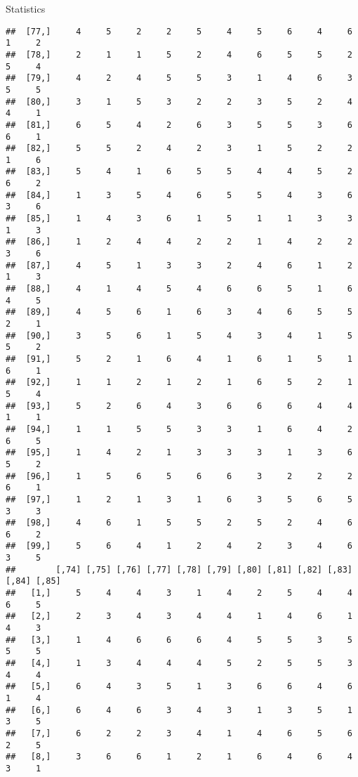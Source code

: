 \documentclass[
  ignorenonframetext,
]{beamer}
\begin{document}
\begin{frame}[fragile]{Statistics}
\begin{verbatim}
##  [77,]     4     5     2     2     5     4     5     6     4     6     1     2
##  [78,]     2     1     1     5     2     4     6     5     5     2     5     4
##  [79,]     4     2     4     5     5     3     1     4     6     3     5     5
##  [80,]     3     1     5     3     2     2     3     5     2     4     4     1
##  [81,]     6     5     4     2     6     3     5     5     3     6     6     1
##  [82,]     5     5     2     4     2     3     1     5     2     2     1     6
##  [83,]     5     4     1     6     5     5     4     4     5     2     6     2
##  [84,]     1     3     5     4     6     5     5     4     3     6     3     6
##  [85,]     1     4     3     6     1     5     1     1     3     3     1     3
##  [86,]     1     2     4     4     2     2     1     4     2     2     3     6
##  [87,]     4     5     1     3     3     2     4     6     1     2     1     3
##  [88,]     4     1     4     5     4     6     6     5     1     6     4     5
##  [89,]     4     5     6     1     6     3     4     6     5     5     2     1
##  [90,]     3     5     6     1     5     4     3     4     1     5     5     2
##  [91,]     5     2     1     6     4     1     6     1     5     1     6     1
##  [92,]     1     1     2     1     2     1     6     5     2     1     5     4
##  [93,]     5     2     6     4     3     6     6     6     4     4     1     1
##  [94,]     1     1     5     5     3     3     1     6     4     2     6     5
##  [95,]     1     4     2     1     3     3     3     1     3     6     5     2
##  [96,]     1     5     6     5     6     6     3     2     2     2     6     1
##  [97,]     1     2     1     3     1     6     3     5     6     5     3     3
##  [98,]     4     6     1     5     5     2     5     2     4     6     6     2
##  [99,]     5     6     4     1     2     4     2     3     4     6     3     5
##        [,74] [,75] [,76] [,77] [,78] [,79] [,80] [,81] [,82] [,83] [,84] [,85]
##   [1,]     5     4     4     3     1     4     2     5     4     4     6     5
##   [2,]     2     3     4     3     4     4     1     4     6     1     4     3
##   [3,]     1     4     6     6     6     4     5     5     3     5     5     5
##   [4,]     1     3     4     4     4     5     2     5     5     3     4     4
##   [5,]     6     4     3     5     1     3     6     6     4     6     1     4
##   [6,]     6     4     6     3     4     3     1     3     5     1     3     5
##   [7,]     6     2     2     3     4     1     4     6     5     6     2     5
##   [8,]     3     6     6     1     2     1     6     4     6     4     3     1

\end{verbatim}
\end{frame}
\end{document}
